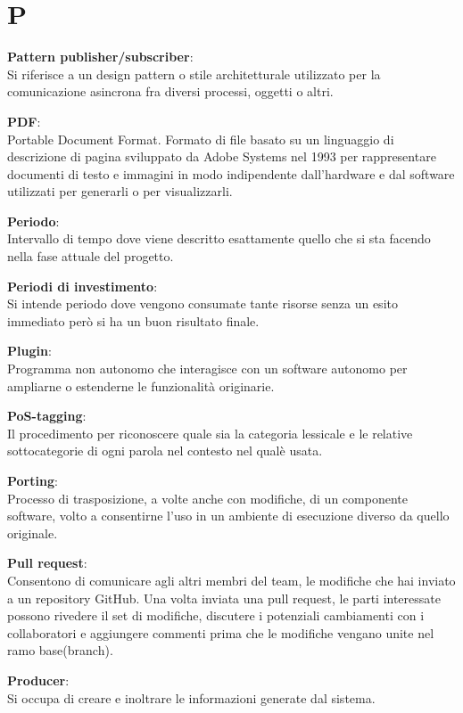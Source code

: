 \documentclass[a4paper, oneside, openany, dvipsnames, table]{article}
\begin{document}
\newpage
\section{P}
\textbf{Pattern publisher/subscriber}:\\	 Si riferisce a un design pattern o stile architetturale utilizzato per la comunicazione asincrona fra diversi processi, oggetti o altri.

\textbf{PDF}:\\	Portable Document Format. Formato di file basato su un linguaggio di descrizione di pagina sviluppato da Adobe Systems nel 1993 per rappresentare documenti di testo e immagini in modo indipendente dall'hardware e dal software utilizzati per generarli o per visualizzarli.

\textbf{Periodo}:\\	Intervallo di tempo dove viene descritto esattamente quello che si sta facendo nella fase attuale del progetto.

\textbf{Periodi di investimento}:\\	Si intende periodo dove vengono consumate tante risorse senza un esito immediato però si ha un buon risultato finale.

\textbf{Plugin}:\\	Programma non autonomo che interagisce con un software autonomo per ampliarne o estenderne le funzionalità originarie.

\textbf{PoS-tagging}:\\	Il procedimento per riconoscere quale sia la categoria lessicale e le relative sottocategorie di ogni parola nel contesto nel qualè usata.

\textbf{Porting}:\\	Processo di trasposizione, a volte anche con modifiche, di un componente software, volto a consentirne l'uso in un ambiente di esecuzione diverso da quello originale.

\textbf{Pull request}:\\	Consentono di comunicare agli altri membri del team, le modifiche che hai inviato a un repository GitHub. Una volta inviata una pull request, le parti interessate possono rivedere il set di modifiche, discutere i potenziali cambiamenti con i collaboratori e aggiungere commenti prima che le modifiche vengano unite nel ramo base(branch).

\textbf{Producer}:\\	Si occupa di creare e inoltrare le informazioni generate dal sistema.
\end{document}
